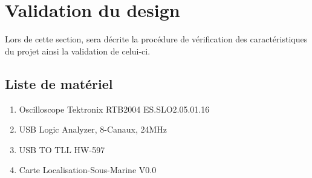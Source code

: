 \section{Validation du design}
Lors de cette section, sera décrite la procédure de vérification des caractéristiques du projet ainsi la validation de celui-ci.
\subsection{Liste de matériel}
{
	\begin{enumerate}
		\item Oscilloscope Tektronix RTB2004 ES.SLO2.05.01.16
		\item USB Logic Analyzer, 8-Canaux, 24MHz
		\item USB TO TLL HW-597
		\item Carte Localisation-Sous-Marine V0.0
	\end{enumerate}
}


